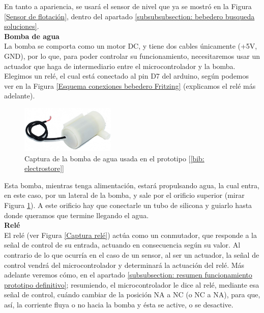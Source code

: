 \documentclass[12pt]{article}
\begin{document}
	\noindent En tanto a apariencia, se usará el sensor de nivel que ya se mostró en la Figura \ref{Sensor de flotación}, dentro del apartado \ref{subsubsubsection: bebedero busqueda soluciones}.\\

	
	\noindent \textbf{Bomba de agua} \\
	
	\noindent La bomba se comporta como un motor DC, y tiene dos cables únicamente (+5V, GND), por lo que, para poder controlar su funcionamiento, necesitaremos usar un actuador que haga de intermediario entre el microcontrolador y la bomba. Elegimos un relé, el cual está conectado al pin D7 del arduino, según podemos ver en la Figura \ref{Esquema conexiones bebedero Fritzing} (explicamos el relé más adelante). \\
	
	\begin{figure}[h]
		\begin{center}
			\includegraphics[width=0.4\textwidth]{img/bomba_agua.jpg}
			\caption{Captura de la bomba de agua usada en el prototipo [\ref{bib: electrostore}]}
			\label{Captura bomba agua}
		\end{center}
	\end{figure}
	
	\noindent Esta bomba, mientras tenga alimentación, estará propulsando agua, la cual entra, en este caso, por un lateral de la bomba, y sale por el orificio superior (mirar Figura \ref{Captura bomba agua}). A este orificio hay que conectarle un tubo de silicona y guiarlo hasta donde queramos que termine llegando el agua. \\
	
	\noindent \textbf{Relé}\\
	
	\noindent El relé (ver Figura \ref{Captura relé}) actúa como un conmutador, que responde a la señal de control de su entrada, actuando en consecuencia según su valor. Al contrario de lo que ocurría en el caso de un sensor, al ser un actuador, la señal de control vendrá del microcontrolador y determinará la actuación del relé. Más adelante veremos cómo, en el apartado \ref{subsubsection: resumen funcionamiento prototipo definitivo}; resumiendo, el microcontrolador le dice al relé, mediante esa señal de control, cuándo cambiar de la posición NA a NC (o NC a NA), para que, así, la corriente fluya o no hacia la bomba y ésta se active, o se desactive. \\
	
\end{document}
